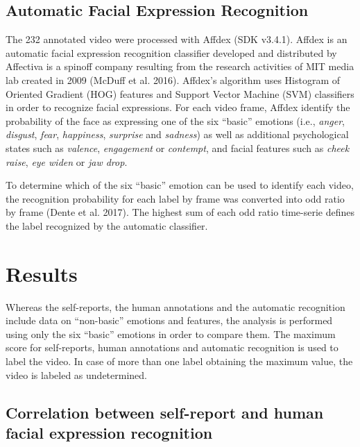 \documentclass[conference,final,]{IEEEtran}
\begin{document}
\hypertarget{automatic-facial-expression-recognition}{%
\subsection{Automatic Facial Expression
Recognition}\label{automatic-facial-expression-recognition}}

The 232 annotated video were processed with Affdex (SDK v3.4.1). Affdex
is an automatic facial expression recognition classifier developed and
distributed by Affectiva is a spinoff company resulting from the
research activities of MIT media lab created in 2009 (McDuff et al.
2016). Affdex's algorithm uses Histogram of Oriented Gradient (HOG)
features and Support Vector Machine (SVM) classifiers in order to
recognize facial expressions. For each video frame, Affdex identify the
probability of the face as expressing one of the six ``basic'' emotions
(i.e., \emph{anger}, \emph{disgust}, \emph{fear}, \emph{happiness},
\emph{surprise} and \emph{sadness}) as well as additional psychological
states such as \emph{valence}, \emph{engagement} or \emph{contempt}, and
facial features such as \emph{cheek raise}, \emph{eye widen} or
\emph{jaw drop}.

To determine which of the six ``basic'' emotion can be used to identify
each video, the recognition probability for each label by frame was
converted into odd ratio by frame (Dente et al. 2017). The highest sum
of each odd ratio time-serie defines the label recognized by the
automatic classifier.

\hypertarget{results}{%
\section{Results}\label{results}}

Whereas the self-reports, the human annotations and the automatic
recognition include data on ``non-basic'' emotions and features, the
analysis is performed using only the six ``basic'' emotions in order to
compare them. The maximum score for self-reports, human annotations and
automatic recognition is used to label the video. In case of more than
one label obtaining the maximum value, the video is labeled as
undetermined.

\hypertarget{correlation-between-self-report-and-human-facial-expression-recognition}{%
\subsection{Correlation between self-report and human facial expression
recognition}\label{correlation-between-self-report-and-human-facial-expression-recognition}}
\end{document}
